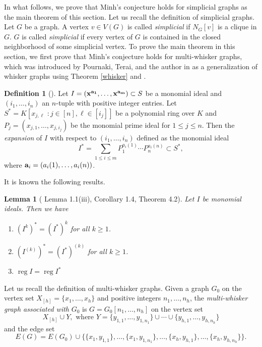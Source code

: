 \documentclass[12pt]{amsart}
\newtheorem{lemma}[thm]{Lemma}
\theoremstyle{definition}
\newtheorem{defi}[thm]{Definition}
\theoremstyle{remark}
\DeclareMathOperator{\reg}{reg}
\begin{document}
In what follows, we prove that Minh's conjecture holds for simplicial graphs as the main theorem of this section. Let us recall the definition of simplicial graphs. Let $G$ be a graph. A vertex $v\in V(G)$ is called {\it simplicial} if $N_{G}[v]$ is a clique in $G$. $G$ is called {\it simplicial} if every vertex of $G$ is contained in the closed neighborhood of some simplicial vertex. To prove the main theorem in this section, we first prove that Minh's conjecture holds for multi-whisker graphs, which was introduced by Pournaki, Terai, and the author in \cite{mpt2025} as a generalization of whisker graphs using Theorem \ref{whisker} and \cite{bh2014}. 

\begin{defi}[\cite{bh2014}]
Let $I=({\bf x}^{\bf a_{1}},\ldots,{\bf x}^{\bf a_{m}})\subset S$ be a monomial ideal and $(i_{1},\ldots, i_{n})$ an $n$-tuple with positive integer entries. Let $S^{*}=K[x_{j,\ell}\,\,:j\in[n], \ell\in[i_{j}]]$ be a polynomial ring over $K$ and $P_{j}=(x_{j,1},\ldots, x_{j,i_{j}})$ be the monomial prime ideal for $1\leq j\leq n$. Then the {\it expansion} of $I$ with respect to $(i_{1},\ldots, i_{n})$ defined as the monomial ideal 
$$I^{*}=\sum_{1\leq i\leq m}P_{1}^{a_{i}(1)}\cdots P_{n}^{a_{i}(n)}\subset S^{*},$$where ${\bf a}_{i}=(a_{i}(1),\ldots, a_{i}(n))$.
\end{defi}

It is known the following results. 

\begin{lemma}[\cite{bh2014} Lemma 1.1(iii), Corollary 1.4, Theorem 4.2]\label{expansion lemma}
Let $I$ be monomial ideals. Then we have 
\begin{enumerate}
\item $(I^{k})^{*}=(I^{*})^{k}$ for all $k\geq1$. 
\item $(I^{(k)})^{*}=(I^{*})^{(k)}$ for all $k\geq1$. 
\item $\reg I=\reg I^{*}$
\end{enumerate}
\end{lemma}


Let us recall the definition of multi-whisker graphs. Given a graph $G_0$ on the vertex set  $X_{[h]}=\{x_{1}, \ldots, x_{h}\}$ and positive integers $n_{1},\ldots, n_{h}$, the \textit{multi-whisker graph associated with }$G_{0}$ is $G=G_{0}[n_{1},\ldots, n_{h}]$ on the vertex set 
$$X_{[h]}\cup Y, \mbox{ where } Y=\{y_{1,1},\ldots, y_{1, n_{1}}\}\cup\cdots\cup\{y_{h,1},\ldots, y_{h,n_{h}}\}$$ and the edge set $$E(G)=E(G_{0})\cup\{\{x_1,y_{1,1}\},\ldots, \{x_{1},y_{1,n_{1}}\},\ldots, \{x_{h},y_{h,1}\},\ldots, \{x_{h},y_{h,n_{h}}\}\}.$$
\end{document}
